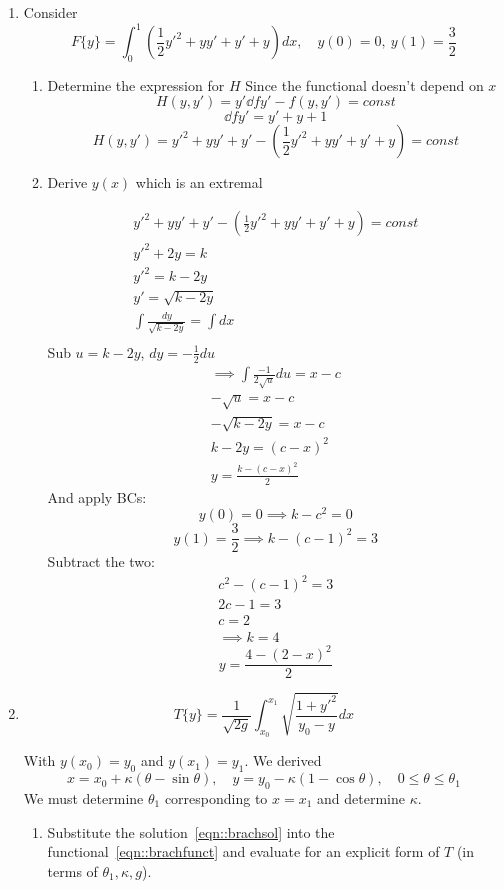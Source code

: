 \documentclass{X:/Documents/Coding/Latex/myassignment}
\begin{document}
\begin{enumerate}
\begin{enumerate}
\end{enumerate}

\item Consider
\[F\{y\} = \int_0^1 \left(\frac12 y'^2 + yy' + y' + y\right) dx, \quad y(0) = 0,\ y(1) = \frac32\]
\begin{enumerate}
	\item Determine the expression for $H$
	Since the functional doesn't depend on $x$
	\[H(y,y') = y' \dd f{y'} - f(y,y') = const\]
	\[\dd f{y'} = y' + y + 1\]
	\[
		H(y,y') = y'^2 +yy' + y'-\left(\frac12 y'^2 + yy' + y' + y\right) = const
	\]
	\item Derive $y(x)$ which is an extremal 

	\begin{align*}
 		y'^2 +yy' + y'-\left(\frac12 y'^2 + yy' + y' + y\right) = const	\\
 		y'^2 + 2y = k\\
 		y'^2 = k-2y\\
 		y' = \sqrt{k-2y}\\
 		\int \frac{dy}{\sqrt{k-2y}} = \int dx\\ 		
	\end{align*}
	Sub $ u = k-2y$, $dy = -\frac12 du$
	\begin{align*}
		\implies \int \frac{-1}{2\sqrt{u}} du = x-c\\
		-\sqrt{u} = x-c\\
		- \sqrt{k-2y} = x-c\\
		k-2y = (c-x)^2\\
		y = \frac{k - (c-x)^2}{2}
	\end{align*}
	And apply BCs:
	\[y(0) = 0 \implies k-c^2 = 0\]
	\[y(1) = \frac32 \implies k - (c-1)^2 = 3\]
	Subtract the two:
	\begin{align*}
		c^2 - (c-1)^2 = 3\\
		2c -1 = 3\\
		c = 2\\
		\implies k = 4
	\end{align*}
	\[\boxed{y = \frac{4 - (2-x)^2}{2}}\]
\end{enumerate}
\item 
\begin{equation}
	T\{y\} = \frac{1}{\sqrt{2g}} \int_{x_0}^{x_1} \sqrt{\frac{1 + y'^2}{y_0 -y}} dx	
	\label{eqn::brachfunct}
\end{equation}

With $y(x_0) = y_0$ and $y(x_1) = y_1$. We derived
\begin{equation}	
	x = x_0 + \kappa (\theta - \sin \theta), \quad y = y_0 - \kappa(1- \cos\theta),\quad 0\leq \theta \leq \theta_1	
	\label{eqn::brachsol}
\end{equation}
We must determine $\theta_1$ corresponding to $x=x_1$ and determine $\kappa$.
\begin{enumerate}
	\item Substitute the solution~\ref{eqn::brachsol} into the functional~\ref{eqn::brachfunct} and evaluate for an explicit form of $T$ (in terms of $\theta_1, \kappa, g$).


\end{enumerate}
\end{enumerate}
\end{document}
